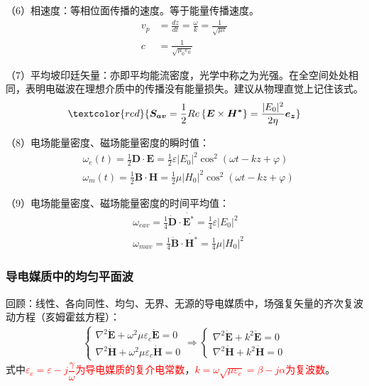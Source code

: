 \documentclass[withoutpreface,bwprint]{cumcmthesis} %
\begin{document}
（6）相速度：等相位面传播的速度。等于能量传播速度。
\begin{align}
    v_p &= \frac{dz}{dt} = \frac{\omega}{k} = \frac{1}{\sqrt{\mu \varepsilon}}\\
    c &= \frac{1}{\sqrt{\mu_0 \varepsilon_0}}
\end{align}

（7）平均坡印廷矢量：亦即平均能流密度，光学中称之为光强。在全空间处处相同，表明电磁波在理想介质中的传播没有能量损失。建议从物理直觉上记住该式。
\begin{align}
    \textcolor{red}{\boldsymbol{S_{av}} = \frac{1}{2}Re\left\{\boldsymbol{E}\times \boldsymbol{H^*}\right\} = \frac{|E_0|^2}{2\eta}\boldsymbol{e_z}}
\end{align}

（8）电场能量密度、磁场能量密度的瞬时值：
\begin{align}
    &\omega_e(t) = \frac{1}{2}\boldsymbol{D}\cdot \boldsymbol{E} = \frac{1}{2}\varepsilon |E_0|^2 \cos^2(\omega t-kz+\varphi)\\
    &\omega_m(t) = \frac{1}{2}\boldsymbol{B}\cdot \boldsymbol{H} = \frac{1}{2}\mu |H_0|^2 \cos^2(\omega t-kz+\varphi)
\end{align}

（9）电场能量密度、磁场能量密度的时间平均值：
\begin{align}
    &\omega_{eav} = \frac{1}{4}\boldsymbol{\dot{D}}\cdot \boldsymbol{\dot{E^*}} = \frac{1}{4}\varepsilon |E_0|^2\\
    &\omega_{mav} = \frac{1}{4}\boldsymbol{\dot{B}}\cdot \boldsymbol{\dot{H^*}} = \frac{1}{4}\mu |H_0|^2
\end{align}

\subsubsection{导电媒质中的均匀平面波}
回顾：线性、各向同性、均匀、无界、无源的导电媒质中，场强复矢量的齐次复波动方程（亥姆霍兹方程）：
\begin{align}
    \begin{cases}
        \nabla^2 \boldsymbol{\dot{E}} + \omega^2 \mu \varepsilon_c \boldsymbol{\dot{E}} = 0 \\
        \nabla^2 \boldsymbol{\dot{H}} + \omega^2 \mu \varepsilon_c \boldsymbol{\dot{H}} = 0
    \end{cases}
    \Rightarrow 
        \begin{cases}
        \nabla^2 \boldsymbol{\dot{E}} + k^2 \boldsymbol{\dot{E}} = 0 \\
        \nabla^2 \boldsymbol{\dot{H}} + k^2 \boldsymbol{\dot{H}} = 0
    \end{cases}
\end{align}
式中\textcolor{red}{$\varepsilon_c = \varepsilon - j\dfrac{\gamma}{\omega}$为导电媒质的复介电常数}，\textcolor{red}{$k=\omega \sqrt{\mu \varepsilon_c}=\beta-j\alpha$为复波数}。
\end{document}

